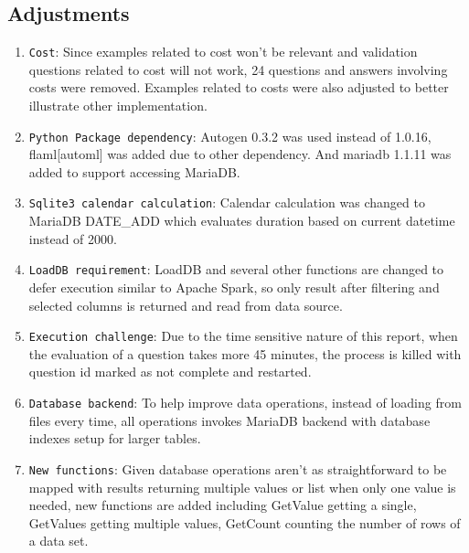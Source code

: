 \documentclass[acmsmall]{acmart}
\begin{document}
\subsection{Adjustments}
\begin{enumerate}
  \item{\texttt{Cost}}: Since examples related to cost won't be relevant and validation questions related to 
  cost will not work, 24 questions and answers involving costs were removed. Examples related to costs were 
  also adjusted to better illustrate other implementation.
  \item{\texttt{Python Package dependency}}: Autogen 0.3.2 was used instead of 1.0.16, flaml[automl] 
  was added due to other dependency. And mariadb 1.1.11 was added to support accessing MariaDB.
  \item{\texttt{Sqlite3 calendar calculation}}: Calendar calculation was changed to MariaDB DATE\_ADD which 
  evaluates duration based on current datetime instead of 2000.
  \item{\texttt{LoadDB requirement}}: LoadDB and several other functions are changed to defer execution 
  similar to Apache Spark, so only result after filtering and selected columns is returned and read from data source.
  \item{\texttt{Execution challenge}}: Due to the time sensitive nature of this report, when the evaluation of a question 
  takes more 45 minutes, the process is killed with question id marked as not complete and restarted.
  \item{\texttt{Database backend}}: To help improve data operations, instead of loading from files every time, 
  all operations invokes MariaDB backend with database indexes setup for larger tables. 
  \item{\texttt{New functions}}: Given database operations aren't as straightforward to be mapped with 
  results returning multiple values or list when only one value is needed, new functions are added 
  including GetValue getting a single, GetValues getting multiple values, 
  GetCount counting the number of rows of a data set.
\end{enumerate}

\end{document}
